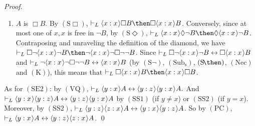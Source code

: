 \documentclass[11pt]{woarticle}
\theoremstyle{break}
\theoremstyle{nonumberplain}
\newcommand{\1}{\;\,|\;\,}
\renewcommand{\t}[1]{\ensuremath{\langle #1  \makebox[.2ex]{}\rangle}}
\newcommand{\T}[1]{\ensuremath{(\mathrm{ #1})}}
\begin{document}
\begin{proof}
\begin{enumerate}
  \item $A$ is $\Box B$.\; By \T{S\Box}, $\vdash_L \t{x:x}\Box B \then
    \Box \t{x:x}B$. Conversely, since at most one of $x,x$ is free in
    $\neg B$, by \T{S\Diamond}, $\vdash_L \t{x:x}\Diamond \neg B \then
    \Diamond \t{x:x} \neg B$.  Contraposing and unraveling the
    definition of the diamond, we have $\vdash_L \Box \neg \t{x:x}\neg
    B \then \neg\t{x:x}\neg\Box \neg\neg B$. Since $\vdash_L \Box \neg
    \t{x:x}\neg B \leftrightarrow \Box \t{x:x}B$ and $\vdash_L
    \neg\t{x:x}\neg\Box \neg\neg B \leftrightarrow \t{x:x}B$ (by
    \T{S\neg}, \T{Sub_s}, \T{S\!\then}, \T{Nec} and \T{K}), this means
    that $\vdash_L \Box \t{x:x}B \then \t{x:x}\Box B$.
  \end{enumerate}
  
  As for \T{SE2}: by \T{VQ}, $\vdash_L \t{y:x}A \leftrightarrow
  \t{y:z}\t{y:x}A.$ And $\vdash_L \t{y:x}\t{y:z}A \leftrightarrow
  \t{y:z}\t{y:x}A$ by \T{SS1} (if $y\not=x$) or \T{SS2} (if
  $y=x$). Moreover, by \T{SS2}, $\vdash_L \t{y:z}\t{z:x}A
  \leftrightarrow \t{y:x}\t{y:z}A$. So by \T{PC}, $\vdash_L \t{y:x}A
  \leftrightarrow \t{y:z}\t{z:x}A$. \qed

\end{proof}
\end{document}
